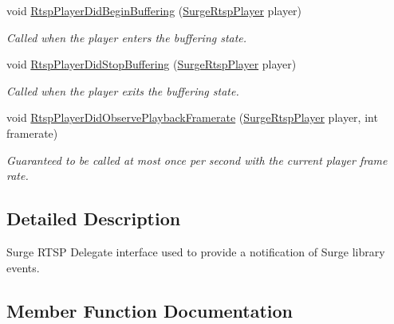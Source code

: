 \begin{DoxyCompactItemize}
void \hyperlink{interface_surge_xamarini_o_s_bindings_1_1_surge_rtsp_player_delegate_a60aaf86b1f006e37c387d6dbe710977f}{Rtsp\+Player\+Did\+Begin\+Buffering} (\hyperlink{interface_surge_xamarini_o_s_bindings_1_1_surge_rtsp_player}{Surge\+Rtsp\+Player} player)
\begin{DoxyCompactList}\small\item\em Called when the player enters the buffering state. \end{DoxyCompactList}\item 
void \hyperlink{interface_surge_xamarini_o_s_bindings_1_1_surge_rtsp_player_delegate_ac178f502817c60bfe3a57b7393d66232}{Rtsp\+Player\+Did\+Stop\+Buffering} (\hyperlink{interface_surge_xamarini_o_s_bindings_1_1_surge_rtsp_player}{Surge\+Rtsp\+Player} player)
\begin{DoxyCompactList}\small\item\em Called when the player exits the buffering state. \end{DoxyCompactList}\item 
void \hyperlink{interface_surge_xamarini_o_s_bindings_1_1_surge_rtsp_player_delegate_a96ebb6b82e20ba68d1b91bee632efd06}{Rtsp\+Player\+Did\+Observe\+Playback\+Framerate} (\hyperlink{interface_surge_xamarini_o_s_bindings_1_1_surge_rtsp_player}{Surge\+Rtsp\+Player} player, int framerate)
\begin{DoxyCompactList}\small\item\em Guaranteed to be called at most once per second with the current player frame rate. \end{DoxyCompactList}\end{DoxyCompactItemize}


\subsection{Detailed Description}
Surge R\+T\+SP Delegate interface used to provide a notification of Surge library events. 



\subsection{Member Function Documentation}
\mbox{\label{interface_surge_xamarini_o_s_bindings_1_1_surge_rtsp_player_delegate_a60aaf86b1f006e37c387d6dbe710977f}} 
